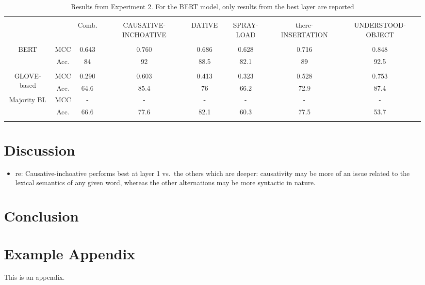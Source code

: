 \documentclass[11pt]{article}
\begin{document}
\begin{table}[]
\centering
\small
\setlength\tabcolsep{2pt}
\begin{tabular}{cccccccc}\hline\hline\\[1pt]
                             &      & Comb. & CAUSATIVE-INCHOATIVE & DATIVE & SPRAY-LOAD & there-INSERTATION & UNDERSTOOD-OBJECT \\[3pt]\hline\hline\\[0.5pt]
\multirow{2}{*}{BERT}        & MCC  & 0.643 & 0.760                & 0.686  & 0.628      & 0.716             & 0.848             \\[1pt]
                             & Acc. & 84    & 92                   & 88.5   & 82.1       & 89                & 92.5              \\[1pt]\hline\\[0.5pt]
\multirow{2}{*}{GLOVE-based} & MCC  & 0.290 & 0.603                & 0.413  & 0.323      & 0.528             & 0.753             \\
                             & Acc. & 64.6  & 85.4                 & 76     & 66.2       & 72.9              & 87.4              \\[1pt]\hline
\multirow{2}{*}{Majority BL} & MCC  & -     & -                    & -      & -          & -                 & -                 \\
                             & Acc. & 66.6  & 77.6                 & 82.1   & 60.3       & 77.5              & 53.7           \\[1pt] \hline \\[0.5pt]
\end{tabular}
\caption{Results from Experiment 2. For the BERT model, only results from the best layer are reported}
\label{sentence-results}
\end{table}



\section{Discussion}
\label{sec:discussion}

\begin{itemize}
    \item re: Causative-inchoative performs best at layer 1 vs.~the others which are deeper: causativity may be more of an issue related to the lexical semantics of any given word, whereas the other alternations may be more syntactic in nature.
    
\end{itemize}

\section{Conclusion}
\label{sec:conclusion}




\appendix

\section{Example Appendix}
\label{sec:appendix}

This is an appendix.
\end{document}
